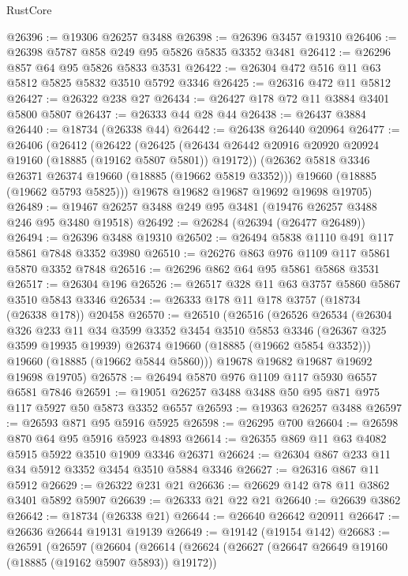 \begin{lexlean}{RustCore}
\begin{coremodule}
@26396 := @19306 @26257 @3488
@26398 := @26396 @3457 @19310
@26406 := @26398 @5787 @858 @249 @95 @5826 @5835 @3352 @3481
@26412 := @26296 @857 @64 @95 @5826 @5833 @3531
@26422 := @26304 @472 @516 @11 @63 @5812 @5825 @5832 @3510 @5792 @3346
@26425 := @26316 @472 @11 @5812
@26427 := @26322 @238 @27
@26434 := @26427 @178 @72 @11 @3884 @3401 @5800 @5807
@26437 := @26333 @44 @28 @44
@26438 := @26437 @3884
@26440 := @18734 (@26338 @44)
@26442 := @26438 @26440 @20964
@26477 := @26406
    (@26412
      (@26422
        (@26425 (@26434 @26442 @20916 @20920 @20924 @19160 (@18885 (@19162 @5807 @5801)) @19172))
        (@26362 @5818 @3346 @26371 @26374 @19660 (@18885 (@19662 @5819 @3352)))
        @19660
        (@18885 (@19662 @5793 @5825)))
      @19678
      @19682
      @19687
      @19692
      @19698
      @19705)
@26489 := @19467 @26257 @3488 @249 @95 @3481 (@19476 @26257 @3488 @246 @95 @3480 @19518)
@26492 := @26284 (@26394 (@26477 @26489))
@26494 := @26396 @3488 @19310
@26502 := @26494 @5838 @1110 @491 @117 @5861 @7848 @3352 @3980
@26510 := @26276 @863 @976 @1109 @117 @5861 @5870 @3352 @7848
@26516 := @26296 @862 @64 @95 @5861 @5868 @3531
@26517 := @26304 @196
@26526 := @26517 @328 @11 @63 @3757 @5860 @5867 @3510 @5843 @3346
@26534 := @26333 @178 @11 @178 @3757 (@18734 (@26338 @178)) @20458
@26570 := @26510
    (@26516
      (@26526
        @26534
        (@26304
          @326
          @233
          @11
          @34
          @3599
          @3352
          @3454
          @3510
          @5853
          @3346
          (@26367 @325 @3599 @19935 @19939)
          @26374
          @19660
          (@18885 (@19662 @5854 @3352)))
        @19660
        (@18885 (@19662 @5844 @5860)))
      @19678
      @19682
      @19687
      @19692
      @19698
      @19705)
@26578 := @26494 @5870 @976 @1109 @117 @5930 @6557 @6581 @7846
@26591 := @19051 @26257 @3488 @3488 @50 @95 @871 @975 @117 @5927 @50 @5873 @3352 @6557
@26593 := @19363 @26257 @3488
@26597 := @26593 @871 @95 @5916 @5925
@26598 := @26295 @700
@26604 := @26598 @870 @64 @95 @5916 @5923 @4893
@26614 := @26355 @869 @11 @63 @4082 @5915 @5922 @3510 @1909 @3346 @26371
@26624 := @26304 @867 @233 @11 @34 @5912 @3352 @3454 @3510 @5884 @3346
@26627 := @26316 @867 @11 @5912
@26629 := @26322 @231 @21
@26636 := @26629 @142 @78 @11 @3862 @3401 @5892 @5907
@26639 := @26333 @21 @22 @21
@26640 := @26639 @3862
@26642 := @18734 (@26338 @21)
@26644 := @26640 @26642 @20911
@26647 := @26636 @26644 @19131 @19139
@26649 := @19142 (@19154 @142)
@26683 := @26591
    (@26597
      (@26604
        (@26614
          (@26624
            (@26627 (@26647 @26649 @19160 (@18885 (@19162 @5907 @5893)) @19172))

\end{coremodule}
\end{lexlean}
